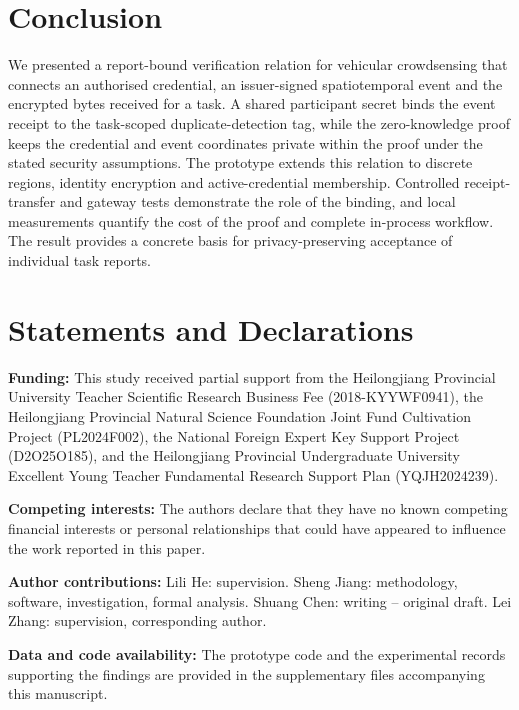 \documentclass[pdflatex,iicol,sn-mathphys-num]{sn-jnl}
\begin{document}
\section{Conclusion}
We presented a report-bound verification relation for vehicular crowdsensing that connects an authorised credential, an issuer-signed spatiotemporal event and the encrypted bytes received for a task. A shared participant secret binds the event receipt to the task-scoped duplicate-detection tag, while the zero-knowledge proof keeps the credential and event coordinates private within the proof under the stated security assumptions. The prototype extends this relation to discrete regions, identity encryption and active-credential membership. Controlled receipt-transfer and gateway tests demonstrate the role of the binding, and local measurements quantify the cost of the proof and complete in-process workflow. The result provides a concrete basis for privacy-preserving acceptance of individual task reports.

\section*{Statements and Declarations}
\noindent\textbf{Funding:} This study received partial support from the Heilongjiang Provincial University Teacher Scientific Research Business Fee (2018-KYYWF0941), the Heilongjiang Provincial Natural Science Foundation Joint Fund Cultivation Project (PL2024F002), the National Foreign Expert Key Support Project (D2O25O185), and the Heilongjiang Provincial Undergraduate University Excellent Young Teacher Fundamental Research Support Plan (YQJH2024239).

\noindent\textbf{Competing interests:} The authors declare that they have no known competing financial interests or personal relationships that could have appeared to influence the work reported in this paper.

\noindent\textbf{Author contributions:} Lili He: supervision. Sheng Jiang: methodology, software, investigation, formal analysis. Shuang Chen: writing -- original draft. Lei Zhang: supervision, corresponding author.

\noindent\textbf{Data and code availability:} The prototype code and the experimental records supporting the findings are provided in the supplementary files accompanying this manuscript.

\end{document}
